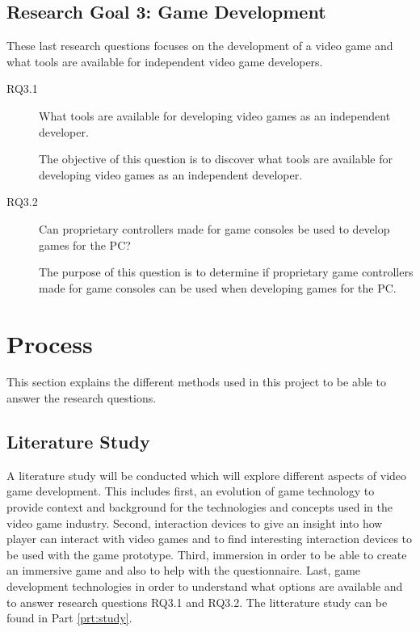 \subsection{Research Goal 3: Game Development}
These last research questions focuses on the development of a video game and what tools are available for independent video game developers.
\begin{description}
	\item[RQ3.1] What tools are available for developing video games as an independent developer.
	
	The objective of this question is to discover what tools are available for developing video games as an independent developer. 
	
	\item[RQ3.2] Can proprietary controllers made for game consoles be used to develop games for the PC?
	
	The purpose of this question is to determine if proprietary game controllers made for game consoles can be used when developing games for the PC.
\end{description}
	

\section{Process}
This section explains the different methods used in this project to be able to answer the research questions. 

\subsection{Literature Study}
A literature study will be conducted which will explore different aspects of video game development. This includes first, an evolution of game technology to provide context and background for the technologies and concepts used in the video game industry. Second, interaction devices to give an insight into how player can interact with video games and to find interesting interaction devices to be used with the game prototype. Third, immersion in order to be able to create an immersive game and also to help with the questionnaire. Last, game development technologies in order to understand what options are available and to answer research questions RQ3.1 and RQ3.2. The litterature study can be found in Part \ref{prt:study}.

